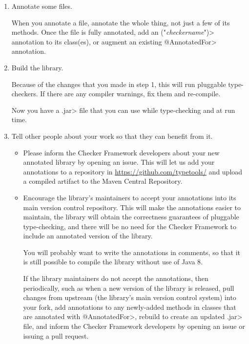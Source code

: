 \begin{enumerate}
\item Annotate some files.

  When you annotate a file, annotate the whole thing, not just a few of its
  methods.  Once the file is fully annotated, add an
  \<(\ttlcb"\emph{checkername}"\ttrcb)>
  annotation to its class(es), or augment an existing \<@AnnotatedFor>
  annotation.

\item
  Build the library.

  Because of the changes that you made in step 1, this will run pluggable
  type-checkers.  If there are any compiler warnings, fix them and re-compile.

  Now you have a \<.jar> file that you can use while type-checking and at
  run time.

\item
  Tell other people about your work so that they can benefit from it.

  \begin{itemize}
  \item
    Please inform the Checker Framework developers
    about your new annotated library by opening an issue.
    This will let us add your annotations to a repository in
    \url{https://github.com/typetools/} and upload a compiled artifact to
    the Maven Central Repository.

  \item
    Encourage the library's maintainers to accept your annotations into its
    main version control repository.  This will make the annotations easier
    to maintain, the library will obtain the correctness guarantees of
    pluggable type-checking, and there will be no need for the Checker
    Framework to include an annotated version of the library.

    You will probably want to write the annotations in comments, so that it
    is still possible to compile the library without use of Java 8.

    If the library maintainers do not accept the annotations, then
    periodically, such as when a new version of the library is released,
    pull changes from upstream (the library's main version control system)
    into your fork, add annotations to any newly-added methods in classes
    that are annotated with \<@AnnotatedFor>, rebuild to create an updated
    \<.jar> file, and inform the Checker Framework developers by opening an
    issue or issuing a pull request.
  \end{itemize}

\end{enumerate}


